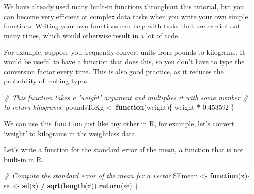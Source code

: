 \documentclass[]{book}
\newenvironment{Shaded}{\begin{snugshade}}{\end{snugshade}}
\newcommand{\CommentTok}[1]{\textcolor[rgb]{0.56,0.35,0.01}{\textit{#1}}}
\newcommand{\ControlFlowTok}[1]{\textcolor[rgb]{0.13,0.29,0.53}{\textbf{#1}}}
\newcommand{\FloatTok}[1]{\textcolor[rgb]{0.00,0.00,0.81}{#1}}
\newcommand{\KeywordTok}[1]{\textcolor[rgb]{0.13,0.29,0.53}{\textbf{#1}}}
\newcommand{\NormalTok}[1]{#1}
\newcommand{\OperatorTok}[1]{\textcolor[rgb]{0.81,0.36,0.00}{\textbf{#1}}}
\newcommand{\StringTok}[1]{\textcolor[rgb]{0.31,0.60,0.02}{#1}}
\begin{document}
We have already used many built-in functions throughout this tutorial, but you can become very efficient at complex data tasks when you write your own simple functions. Writing your own functions can help with tasks that are carried out many times, which would otherwise result in a lot of code.

For example, suppose you frequently convert units from pounds to kilograms. It would be useful to have a function that does this, so you don't have to type the conversion factor every time. This is also good practice, as it reduces the probability of making typos.

\begin{Shaded}
\begin{Highlighting}[]
\CommentTok{# This function takes a 'weight' argument and multiplies it with some number }
\CommentTok{# to return kilograms.}
\NormalTok{poundsToKg <-}\StringTok{ }\ControlFlowTok{function}\NormalTok{(weight)\{}
\NormalTok{  weight }\OperatorTok{*}\StringTok{ }\FloatTok{0.453592}
\NormalTok{\}}
\end{Highlighting}
\end{Shaded}

We can use this \texttt{function} just like any other in R, for example, let's convert `weight' to kilograms in the weightloss data.

\begin{Shaded}
\end{Shaded}

Let's write a function for the standard error of the mean, a function that is not built-in in R.

\begin{Shaded}
\begin{Highlighting}[]
\CommentTok{# Compute the standard error of the mean for a vector}
\NormalTok{SEmean <-}\StringTok{ }\ControlFlowTok{function}\NormalTok{(x)\{}
\NormalTok{  se <-}\StringTok{ }\KeywordTok{sd}\NormalTok{(x) }\OperatorTok{/}\StringTok{ }\KeywordTok{sqrt}\NormalTok{(}\KeywordTok{length}\NormalTok{(x))}
  \KeywordTok{return}\NormalTok{(se)}
\NormalTok{\}}
\end{Highlighting}
\end{Shaded}
\end{document}
